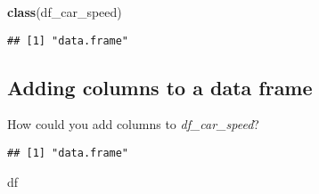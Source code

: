 \documentclass[
]{article}
\newenvironment{Shaded}{\begin{snugshade}}{\end{snugshade}}
\newcommand{\CommentTok}[1]{\textcolor[rgb]{0.56,0.35,0.01}{\textit{#1}}}
\newcommand{\FunctionTok}[1]{\textcolor[rgb]{0.13,0.29,0.53}{\textbf{#1}}}
\newcommand{\NormalTok}[1]{#1}
\newcommand{\OtherTok}[1]{\textcolor[rgb]{0.56,0.35,0.01}{#1}}
\newcommand{\SpecialCharTok}[1]{\textcolor[rgb]{0.81,0.36,0.00}{\textbf{#1}}}
\begin{document}
\begin{Shaded}
\begin{Highlighting}[]
\FunctionTok{class}\NormalTok{(df\_car\_speed)}
\end{Highlighting}
\end{Shaded}

\begin{verbatim}
## [1] "data.frame"
\end{verbatim}

\hypertarget{adding-columns-to-a-data-frame}{%
\subsection{Adding columns to a data
frame}\label{adding-columns-to-a-data-frame}}

How could you add columns to \emph{df\_car\_speed}?

\begin{Shaded}
\end{Shaded}

\begin{verbatim}
## [1] "data.frame"
\end{verbatim}

\begin{Shaded}
\begin{Highlighting}[]
\NormalTok{df}
\end{Highlighting}
\end{Shaded}
\end{document}
